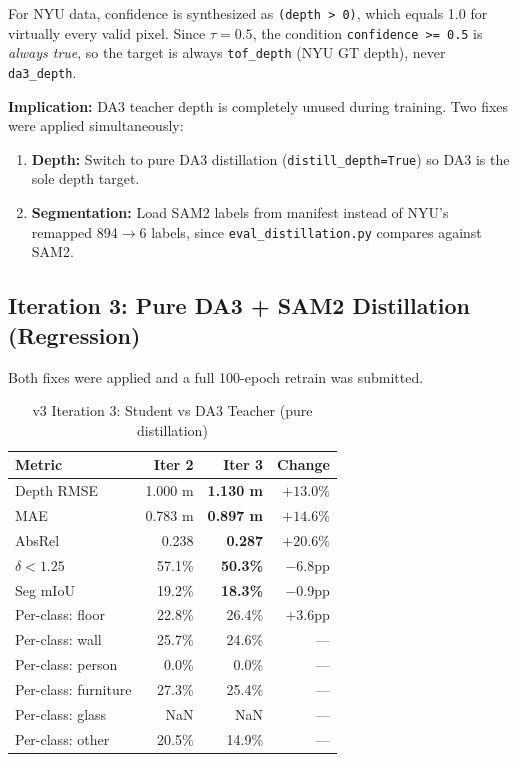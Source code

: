 \documentclass[11pt,a4paper]{article}
\begin{document}
For NYU data, confidence is synthesized as \texttt{(depth > 0)}, which
equals 1.0 for virtually every valid pixel. Since $\tau = 0.5$, the
condition \texttt{confidence >= 0.5} is \emph{always true}, so the target
is always \texttt{tof\_depth} (NYU GT depth), never \texttt{da3\_depth}.

\textbf{Implication:} DA3 teacher depth is completely unused during training.
Two fixes were applied simultaneously:
\begin{enumerate}[nosep]
  \item \textbf{Depth:} Switch to pure DA3 distillation (\texttt{distill\_depth=True})
    so DA3 is the sole depth target.
  \item \textbf{Segmentation:} Load SAM2 labels from manifest instead of NYU's
    remapped 894$\to$6 labels, since \texttt{eval\_distillation.py} compares
    against SAM2.
\end{enumerate}

\subsection{Iteration 3: Pure DA3 + SAM2 Distillation (Regression)}

Both fixes were applied and a full 100-epoch retrain was submitted.

\begin{table}[h]
\centering
\caption{v3 Iteration 3: Student vs DA3 Teacher (pure distillation)}
\label{tab:v3-iter3-eval}
\begin{tabular}{lrrr}
\toprule
\textbf{Metric} & \textbf{Iter 2} & \textbf{Iter 3} & \textbf{Change} \\
\midrule
Depth RMSE              & 1.000 m & \textcolor{regression}{\textbf{1.130 m}} & $+13.0\%$ \\
MAE                     & 0.783 m & \textcolor{regression}{\textbf{0.897 m}} & $+14.6\%$ \\
AbsRel                  & 0.238   & \textcolor{regression}{\textbf{0.287}}   & $+20.6\%$ \\
$\delta < 1.25$         & 57.1\%  & \textcolor{regression}{\textbf{50.3\%}}  & $-6.8$pp \\
\midrule
Seg mIoU                & 19.2\%  & \textcolor{regression}{\textbf{18.3\%}}  & $-0.9$pp \\
Per-class: floor        & 22.8\%  & \textcolor{improved}{26.4\%} & $+3.6$pp \\
Per-class: wall         & 25.7\%  & 24.6\% & --- \\
Per-class: person       & 0.0\%   & 0.0\%  & --- \\
Per-class: furniture    & 27.3\%  & 25.4\% & --- \\
Per-class: glass        & NaN     & NaN    & --- \\
Per-class: other        & 20.5\%  & 14.9\% & --- \\
\bottomrule
\end{tabular}
\end{table}
\end{document}
